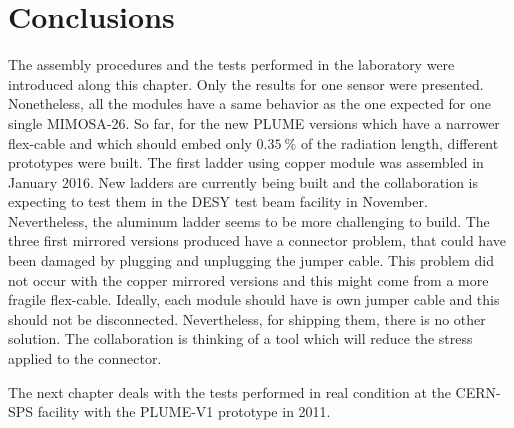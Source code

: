 \section{Conclusions}

  The assembly procedures and the tests performed in the laboratory were introduced along this chapter.
  Only the results for one sensor were presented.
  Nonetheless, all the modules have a same behavior as the one expected for one single \gls{MIMOSA}-26.
  So far, for the new \gls{PLUME} versions which have a narrower flex-cable and which should embed only $0.35~\%$ of the radiation length, different prototypes were built. 
  The first ladder using copper module was assembled in January 2016.
  New ladders are currently being built and the collaboration is expecting to test them in the \gls{DESY} test beam facility in November.
  Nevertheless, the aluminum ladder seems to be more challenging to build.
  The three first mirrored versions produced have a connector problem, that could have been damaged by plugging and unplugging the jumper cable.
  This problem did not occur with the copper mirrored versions and this might come from a more fragile flex-cable.
  Ideally, each module should have is own jumper cable and this should not be disconnected.
  Nevertheless, for shipping them, there is no other solution.
  The collaboration is thinking of a tool which will reduce the stress applied to the connector.

  The next chapter deals with the tests performed in real condition at the CERN-SPS facility with the PLUME-V1 prototype in 2011.


